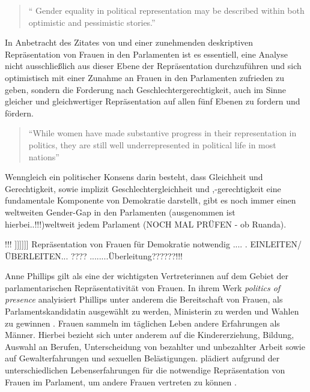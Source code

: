 \documentclass[12pt, 
    twoside=false, 
    bibliography=totoc, 
    numbers=endperiod, 
    headings=normal, 
    toc=chapterentrydotfill
    ]{scrbook}
\begin{document}
\begin{quote}
    \enquote{ Gender equality in political representation may be described within both optimistic and pessimistic stories.} \parencite[149]{celis_2018}
\end{quote}

In Anbetracht des Zitates von \textcite{celis_2018} und einer zunehmenden deskriptiven Repräsentation von Frauen in den Parlamenten ist es essentiell, eine Analyse nicht ausschließlich aus dieser Ebene der Repräsentation durchzuführen und sich optimistisch mit einer Zunahme an Frauen in den Parlamenten zufrieden zu geben, sondern die Forderung nach Geschlechtergerechtigkeit, auch im Sinne gleicher und gleichwertiger Repräsentation auf allen fünf Ebenen zu fordern und fördern. 

\begin{quote}
    \enquote{While women have made substantive progress in their representation in politics, they are still well underrepresented in political life in most nations} \parencite[2]{coffe_2013}
\end{quote}

Wenngleich ein politischer Konsens darin besteht, dass Gleichheit und Gerechtigkeit, sowie implizit Geschlechtergleichheit und ,-gerechtigkeit eine fundamentale Komponente von Demokratie darstellt, gibt es noch immer einen weltweiten Gender-Gap in den Parlamenten (ausgenommen ist hierbei..!!!)weltweit jedem Parlament (NOCH MAL PRÜFEN - ob Ruanda).  

!!!
]]]]]]
 Repräsentation von Frauen für Demokratie notwendig .... . EINLEITEN/ÜBERLEITEN... ???? ........Überleitung??????!!!
 


Anne Phillips gilt als eine der wichtigsten Vertreterinnen auf dem Gebiet der parlamentarischen Repräsentativität von Frauen. In ihrem Werk \emph{politics of presence} \parencite*{phillips_1998} analyisiert Phillips unter anderem die Bereitschaft von Frauen, als Parlamentskandidatin ausgewählt zu werden, Ministerin zu werden und Wahlen zu gewinnen \parencite[vgl.][416f.]{blaxill_2016}. Frauen sammeln im täglichen Leben andere Erfahrungen als Männer. Hierbei bezieht sich \textcite{phillips_1998} unter anderem auf die Kindererziehung, Bildung, Auswahl an Berufen, Unterscheidung von bezahlter und unbezahlter Arbeit sowie auf Gewalterfahrungen und sexuellen Belästigungen. \textcite{phillips_1998} plädiert aufgrund der unterschiedlichen Lebenserfahrungen für die notwendige Repräsentation von Frauen im Parlament, um andere Frauen vertreten zu können \parencite[vgl.][52]{wangnerud_2009}.
\end{document}
